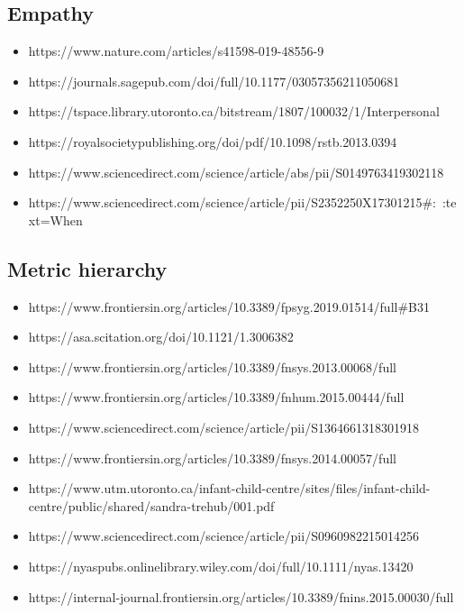 \documentclass{article}
\begin{document}
\subsection{Empathy}

\begin{itemize}
  \item https://www.nature.com/articles/s41598-019-48556-9
  \item https://journals.sagepub.com/doi/full/10.1177/03057356211050681
  \item https://tspace.library.utoronto.ca/bitstream/1807/100032/1/Interpersonal%
  \item https://royalsocietypublishing.org/doi/pdf/10.1098/rstb.2013.0394
  \item https://www.sciencedirect.com/science/article/abs/pii/S0149763419302118
  \item https://www.sciencedirect.com/science/article/pii/S2352250X17301215#:~:text=When%
\end{itemize}

\subsection{Metric hierarchy}
\begin{itemize}
  \item https://www.frontiersin.org/articles/10.3389/fpsyg.2019.01514/full#B31
  \item https://asa.scitation.org/doi/10.1121/1.3006382
  \item https://www.frontiersin.org/articles/10.3389/fnsys.2013.00068/full
  \item https://www.frontiersin.org/articles/10.3389/fnhum.2015.00444/full
  \item https://www.sciencedirect.com/science/article/pii/S1364661318301918
  \item https://www.frontiersin.org/articles/10.3389/fnsys.2014.00057/full
  \item https://www.utm.utoronto.ca/infant-child-centre/sites/files/infant-child-centre/public/shared/sandra-trehub/001.pdf
  \item https://www.sciencedirect.com/science/article/pii/S0960982215014256 
  \item https://nyaspubs.onlinelibrary.wiley.com/doi/full/10.1111/nyas.13420
  \item https://internal-journal.frontiersin.org/articles/10.3389/fnins.2015.00030/full
\end{itemize}


\end{document}
